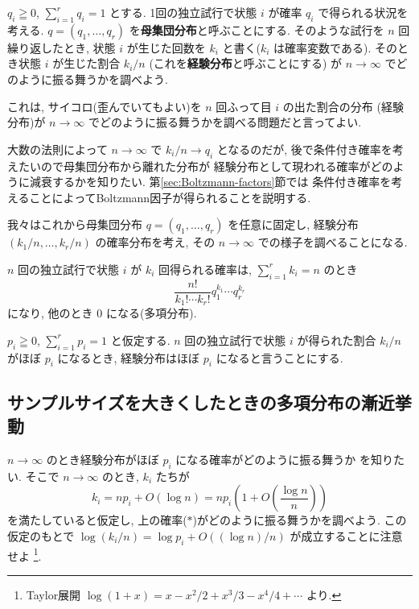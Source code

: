 \documentclass[12pt,twoside]{jarticle}
\theoremstyle{definition} %
\theoremstyle{definition} %
\theoremstyle{definition} %
\numberwithin{theorem}{section}
\numberwithin{equation}{section}
\numberwithin{figure}{section}
\numberwithin{table}{section}
\newcommand\secref[1]{第\ref{#1}節}
\begin{document}
$q_i\geqq 0$, $\sum_{i=1}^r q_i=1$ とする.
1回の独立試行で状態 $i$ が確率 $q_i$ で得られる状況を考える.
$q=(q_1,\ldots,q_r)$ を{\bf 母集団分布}と呼ぶことにする.
そのような試行を $n$ 回繰り返したとき, 
状態 $i$ が生じた回数を $k_i$ と書く($k_i$ は確率変数である).
そのとき状態 $i$ が生じた割合 $k_i/n$ (これを{\bf 経験分布}と呼ぶことにする)
が $n\to\infty$ でどのように振る舞うかを調べよう.

これは, サイコロ(歪んでいてもよい)を $n$ 回ふって目 $i$ の出た割合の分布
(経験分布)が $n\to\infty$ でどのように振る舞うかを調べる問題だと言ってよい.

大数の法則によって $n\to\infty$ で $k_i/n\to q_i$ となるのだが,
後で条件付き確率を考えたいので母集団分布から離れた分布が
経験分布として現われる確率がどのように減衰するかを知りたい.
\secref{sec:Boltzmann-factors}では
条件付き確率を考えることによってBoltzmann因子が得られることを説明する.

我々はこれから母集団分布 $q=(q_1,\ldots,q_r)$ を任意に固定し, 
経験分布 $(k_1/n,\ldots,k_r/n)$ の確率分布を考え,
その $n\to\infty$ での様子を調べることになる.

$n$ 回の独立試行で状態 $i$ が $k_i$ 回得られる確率は, 
$\sum_{i=1}^r k_i=n$ のとき
\[
\frac{n!}{k_1!\cdots k_r!} q_1^{k_1}\cdots q_r^{k_r}
\tag{$*$}
\]
になり, 他のとき $0$ になる(多項分布).

$p_i\geqq 0$, $\sum_{i=1}^r p_i=1$ と仮定する.
$n$ 回の独立試行で状態 $i$ が得られた割合 $k_i/n$ がほぼ $p_i$ になるとき, 
経験分布はほぼ $p_i$ になると言うことにする.


\subsection{サンプルサイズを大きくしたときの多項分布の漸近挙動}
\label{sec:log}

$n\to\infty$ のとき経験分布がほぼ $p_i$ になる確率がどのように振る舞うか
を知りたい. そこで $n\to\infty$ のとき, $k_i$ たちが
\[
k_i= np_i+O(\log n) = np_i\left(1 + O\left(\frac{\log n}{n}\right)\right) 
\tag{$**$}
\]
を満たしていると仮定し, 上の確率($*$)がどのように振る舞うかを調べよう.
この仮定のもとで $\log(k_i/n)=\log p_i+O((\log n)/n)$ が成立することに注意せよ%
\footnote{Taylor展開 $\log(1+x)=x-x^2/2+x^3/3-x^4/4+\cdots$ より.}.
\end{document}
